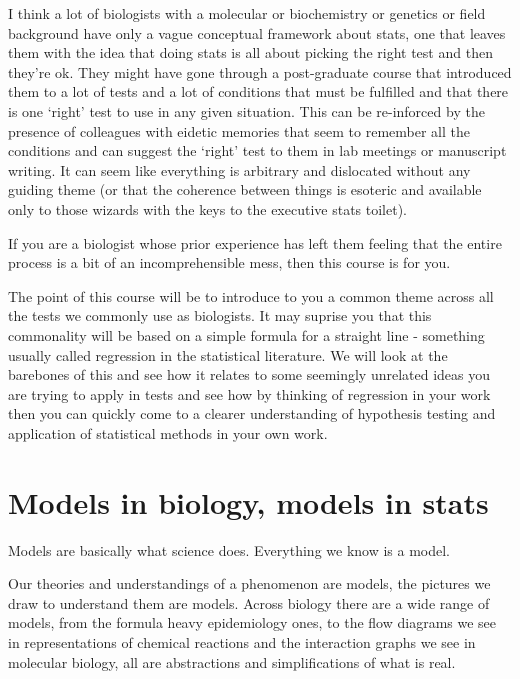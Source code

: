 \documentclass[]{book}
\begin{document}
I think a lot of biologists with a molecular or biochemistry or genetics or field background have only a vague conceptual framework about stats, one that leaves them with the idea that doing stats is all about picking the right test and then they're ok. They might have gone through a post-graduate course that introduced them to a lot of tests and a lot of conditions that must be fulfilled and that there is one `right' test to use in any given situation. This can be re-inforced by the presence of colleagues with eidetic memories that seem to remember all the conditions and can suggest the `right' test to them in lab meetings or manuscript writing. It can seem like everything is arbitrary and dislocated without any guiding theme (or that the coherence between things is esoteric and available only to those wizards with the keys to the executive stats toilet).

If you are a biologist whose prior experience has left them feeling that the entire process is a bit of an incomprehensible mess, then this course is for you.

The point of this course will be to introduce to you a common theme across all the tests we commonly use as biologists. It may suprise you that this commonality will be based on a simple formula for a straight line - something usually called regression in the statistical literature. We will look at the barebones of this and see how it relates to some seemingly unrelated ideas you are trying to apply in tests and see how by thinking of regression in your work then you can quickly come to a clearer understanding of hypothesis testing and application of statistical methods in your own work.

\hypertarget{models-in-biology-models-in-stats}{%
\section{Models in biology, models in stats}\label{models-in-biology-models-in-stats}}

Models are basically what science does. Everything we know is a model.

Our theories and understandings of a phenomenon are models, the pictures we draw to understand them are models. Across biology there are a wide range of models, from the formula heavy epidemiology ones, to the flow diagrams we see in representations of chemical reactions and the interaction graphs we see in molecular biology, all are abstractions and simplifications of what is real.
\end{document}

